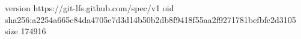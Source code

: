 version https://git-lfs.github.com/spec/v1
oid sha256:a2254a665e84da4705e7d3d14b50b2db8f9418f55aa2f9271781befbfc2d3105
size 174916
